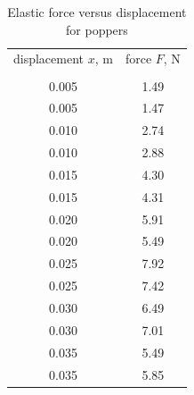 \begin{table}
\caption{Elastic force versus displacement for poppers}
\label{tab:2}
  \begin{center}
    \begin{ruledtabular}
      \begin{tabular}{SS}
        {displacement $x$, \unit{\meter}} & {force $F$, \unit{\newton}} \\
        \colrule \\
        0.005 & 1.49 \\
        0.005 & 1.47 \\ 
        0.010 & 2.74 \\
        0.010 & 2.88 \\
        0.015 & 4.30 \\
        0.015 & 4.31 \\
        0.020 & 5.91 \\
        0.020 & 5.49 \\
        0.025 & 7.92 \\
        0.025 & 7.42 \\
        0.030 & 6.49 \\
        0.030 & 7.01 \\
        0.035 & 5.49 \\
        0.035 & 5.85 \\
      \end{tabular}
    \end{ruledtabular}
  \end{center}
\end{table}
    

